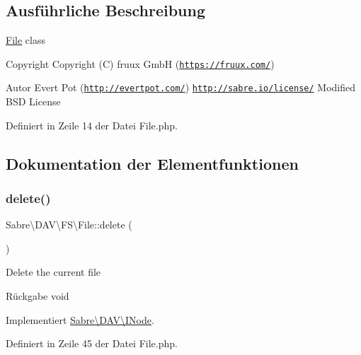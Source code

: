 \subsection{Ausführliche Beschreibung}
\mbox{\hyperlink{class_sabre_1_1_d_a_v_1_1_f_s_1_1_file}{File}} class

\begin{DoxyCopyright}{Copyright}
Copyright (C) fruux GmbH (\href{https://fruux.com/}{\tt https\+://fruux.\+com/}) 
\end{DoxyCopyright}
\begin{DoxyAuthor}{Autor}
Evert Pot (\href{http://evertpot.com/}{\tt http\+://evertpot.\+com/})  \href{http://sabre.io/license/}{\tt http\+://sabre.\+io/license/} Modified B\+SD License 
\end{DoxyAuthor}


Definiert in Zeile 14 der Datei File.\+php.



\subsection{Dokumentation der Elementfunktionen}
\mbox{\label{class_sabre_1_1_d_a_v_1_1_f_s_1_1_file_a87df46fb2d0d38657b31d7ff00c3a519}} 
\subsubsection{\texorpdfstring{delete()}{delete()}}
{\footnotesize\ttfamily Sabre\textbackslash{}\+D\+A\+V\textbackslash{}\+F\+S\textbackslash{}\+File\+::delete (\begin{DoxyParamCaption}{ }\end{DoxyParamCaption})}

Delete the current file

\begin{DoxyReturn}{Rückgabe}
void 
\end{DoxyReturn}


Implementiert \mbox{\hyperlink{interface_sabre_1_1_d_a_v_1_1_i_node_a72cd0ee4e36dfced2b0412d14dbd73e6}{Sabre\textbackslash{}\+D\+A\+V\textbackslash{}\+I\+Node}}.



Definiert in Zeile 45 der Datei File.\+php.

